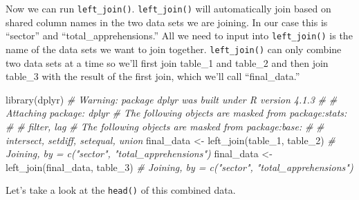 \documentclass[
  a4paper,
]{krantz}
\makeatletter
\newenvironment{Shaded}{\begin{snugshade}}{\end{snugshade}}
\newcommand{\CommentTok}[1]{\textcolor[rgb]{0.37,0.37,0.37}{\textit{#1}}}
\newcommand{\FunctionTok}[1]{\textcolor[rgb]{0,0,0}{#1}}
\newcommand{\NormalTok}[1]{#1}
\newcommand{\OtherTok}[1]{\textcolor[rgb]{0.37,0.37,0.37}{#1}}
\newcommand{\SpecialCharTok}[1]{\textcolor[rgb]{0,0,0}{#1}}
\newcommand{\StringTok}[1]{\textcolor[rgb]{0.5,0.5,0.5}{#1}}
\newenvironment{kframe}{%
\medskip{}
\setlength{\fboxsep}{.8em}
 \def\at@end@of@kframe{}%
 \ifinner\ifhmode%
  \def\at@end@of@kframe{\end{minipage}}%
  \begin{minipage}{\columnwidth}%
 \fi\fi%
 \def\FrameCommand##1{\hskip\@totalleftmargin \hskip-\fboxsep
 \colorbox{shadecolor}{##1}\hskip-\fboxsep
     \hskip-\linewidth \hskip-\@totalleftmargin \hskip\columnwidth}%
 \MakeFramed {\advance\hsize-\width
   \@totalleftmargin\z@ \linewidth\hsize
   \@setminipage}}%
 {\par\unskip\endMakeFramed%
 \at@end@of@kframe}
\renewenvironment{Shaded}{\begin{kframe}}{\end{kframe}}
\makeatother
\begin{document}
\begin{Shaded}
\end{Shaded}

Now we can run \texttt{left\_join()}. \texttt{left\_join()}
will automatically join based on shared column names in the
two data sets we are joining. In our case this is ``sector''
and ``total\_apprehensions.'' All we need to input into
\texttt{left\_join()} is the name of the data sets we want
to join together. \texttt{left\_join()} can only combine two
data sets at a time so we'll first join table\_1 and
table\_2 and then join table\_3 with the result of the first
join, which we'll call ``final\_data.''

\begin{Shaded}
\begin{Highlighting}[]
\FunctionTok{library}\NormalTok{(dplyr)}
\CommentTok{\# Warning: package \textquotesingle{}dplyr\textquotesingle{} was built under R version 4.1.3}
\CommentTok{\# }
\CommentTok{\# Attaching package: \textquotesingle{}dplyr\textquotesingle{}}
\CommentTok{\# The following objects are masked from \textquotesingle{}package:stats\textquotesingle{}:}
\CommentTok{\# }
\CommentTok{\#     filter, lag}
\CommentTok{\# The following objects are masked from \textquotesingle{}package:base\textquotesingle{}:}
\CommentTok{\# }
\CommentTok{\#     intersect, setdiff, setequal, union}
\NormalTok{final\_data }\OtherTok{\textless{}{-}} \FunctionTok{left\_join}\NormalTok{(table\_1, table\_2)}
\CommentTok{\# Joining, by = c("sector", "total\_apprehensions")}
\NormalTok{final\_data }\OtherTok{\textless{}{-}} \FunctionTok{left\_join}\NormalTok{(final\_data, table\_3)}
\CommentTok{\# Joining, by = c("sector", "total\_apprehensions")}
\end{Highlighting}
\end{Shaded}

Let's take a look at the \texttt{head()} of this combined
data.
\end{document}

